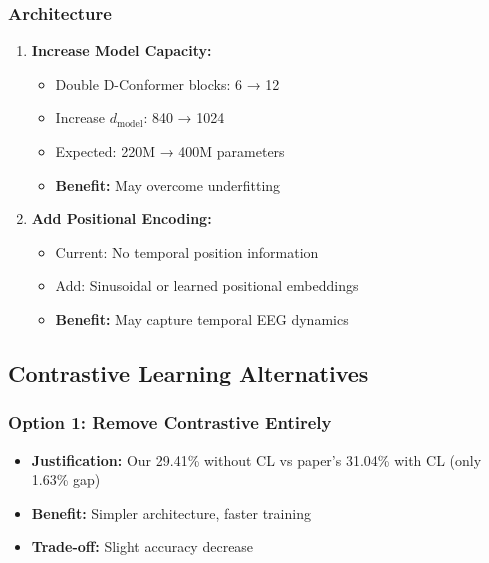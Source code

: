 \documentclass[12pt,a4paper]{article}
\begin{document}
\subsubsection{Architecture}
\begin{enumerate}
    \item \textbf{Increase Model Capacity:}
    \begin{itemize}
        \item Double D-Conformer blocks: 6 → 12
        \item Increase $d_{\text{model}}$: 840 → 1024
        \item Expected: 220M → 400M parameters
        \item \textbf{Benefit:} May overcome underfitting
    \end{itemize}
    
    \item \textbf{Add Positional Encoding:}
    \begin{itemize}
        \item Current: No temporal position information
        \item Add: Sinusoidal or learned positional embeddings
        \item \textbf{Benefit:} May capture temporal EEG dynamics
    \end{itemize}
\end{enumerate}

\subsection{Contrastive Learning Alternatives}

\subsubsection{Option 1: Remove Contrastive Entirely}
\begin{itemize}
    \item \textbf{Justification:} Our 29.41\% without CL vs paper's 31.04\% with CL (only 1.63\% gap)
    \item \textbf{Benefit:} Simpler architecture, faster training
    \item \textbf{Trade-off:} Slight accuracy decrease
\end{itemize}
\end{document}
